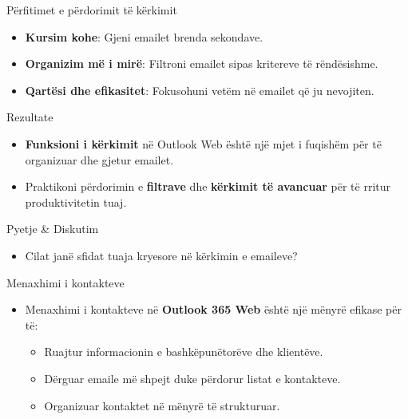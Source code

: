 \documentclass[
  ignorenonframetext,
]{beamer}
\providecommand{\tightlist}{%
  \setlength{\itemsep}{0pt}\setlength{\parskip}{0pt}}
\begin{document}
\begin{frame}{Përfitimet e përdorimit të kërkimit}
\label{puxebrfitimet-e-puxebrdorimit-tuxeb-kuxebrkimit}
\begin{itemize}
\item
  \textbf{Kursim kohe}: Gjeni emailet brenda sekondave.
\item
  \textbf{Organizim më i mirë}: Filtroni emailet sipas kritereve të
  rëndësishme.
\item
  \textbf{Qartësi dhe efikasitet}: Fokusohuni vetëm në emailet që ju
  nevojiten.
\end{itemize}
\end{frame}

\begin{frame}{Rezultate}
\label{rezultate}
\begin{itemize}
\item
  \textbf{Funksioni i kërkimit} në Outlook Web është një mjet i fuqishëm
  për të organizuar dhe gjetur emailet.
\item
  Praktikoni përdorimin e \textbf{filtrave} dhe \textbf{kërkimit të
  avancuar} për të rritur produktivitetin tuaj.
\end{itemize}
\end{frame}

\begin{frame}{Pyetje \& Diskutim}
\label{pyetje-diskutim-3}
\begin{itemize}
\tightlist
\item
  Cilat janë sfidat tuaja kryesore në kërkimin e emaileve?
\end{itemize}
\end{frame}

\begin{frame}{Menaxhimi i kontakteve}
\label{menaxhimi-i-kontakteve}
\begin{itemize}
\item
  Menaxhimi i kontakteve në \textbf{Outlook 365 Web} është një mënyrë
  efikase për të:

  \begin{itemize}
  \item
    Ruajtur informacionin e bashkëpunëtorëve dhe klientëve.
  \item
    Dërguar emaile më shpejt duke përdorur listat e kontakteve.
  \item
    Organizuar kontaktet në mënyrë të strukturuar.
  \end{itemize}
\end{itemize}
\end{frame}
\end{document}
